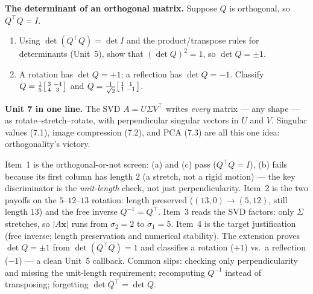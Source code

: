 \documentclass[10pt]{article}
\newcommand{\xx}{\mathbf{x}}
\newcommand{\T}{^{\top}}
\begin{document}
\begin{extensionbox}
\textbf{The determinant of an orthogonal matrix.} Suppose $Q$ is orthogonal, so $Q\T Q=I$.
\begin{enumerate}[label=(\alph*), leftmargin=1.8em, itemsep=4pt]
  \item Using $\det(Q\T Q)=\det I$ and the product/transpose rules for determinants (Unit~5), show that $(\det Q)^2=1$, so $\det Q=\pm1$.
  \item A rotation has $\det Q=+1$; a reflection has $\det Q=-1$. Classify $Q=\tfrac15\begin{bsmallmatrix} 3 & -4\\ 4 & 3 \end{bsmallmatrix}$ and $Q=\tfrac1{\sqrt2}\begin{bsmallmatrix} 1 & 1\\ 1 & -1 \end{bsmallmatrix}$.
\end{enumerate}
\ansline{(a) $\det(Q\T Q)=\det(Q\T)\det(Q)=(\det Q)(\det Q)=(\det Q)^2$, and $\det I=1$, so $(\det Q)^2=1$ and $\det Q=\pm1$.}
\end{extensionbox}

\begin{spiralbox}
\textbf{Unit 7 in one line.} The SVD $A=U\Sigma V\T$ writes \emph{every} matrix --- any shape --- as
rotate--stretch--rotate, with perpendicular singular vectors in $U$ and $V$. Singular values (7.1), image
compression (7.2), and PCA (7.3) are all this one idea: orthogonality's victory.
\end{spiralbox}

\begin{teachernote}
Item~1 is the orthogonal-or-not screen: (a) and (c) pass ($Q\T Q=I$), (b) fails because its first column has
length $2$ (a stretch, not a rigid motion) --- the key discriminator is the \emph{unit-length} check, not just
perpendicularity. Item~2 is the two payoffs on the $5$--$12$--$13$ rotation: length preserved ($(13,0)\to(5,12)$,
still length $13$) and the free inverse $Q^{-1}=Q\T$. Item~3 reads the SVD factors: only $\Sigma$ stretches, so
$|A\xx|$ runs from $\sigma_2=2$ to $\sigma_1=5$. Item~4 is the target justification (free inverse; length
preservation and numerical stability). The extension proves $\det Q=\pm1$ from $\det(Q\T Q)=1$ and classifies a
rotation ($+1$) vs.\ a reflection ($-1$) --- a clean Unit~5 callback. Common slips: checking only
perpendicularity and missing the unit-length requirement; recomputing $Q^{-1}$ instead of transposing;
forgetting $\det Q\T=\det Q$.
\end{teachernote}
\end{document}

